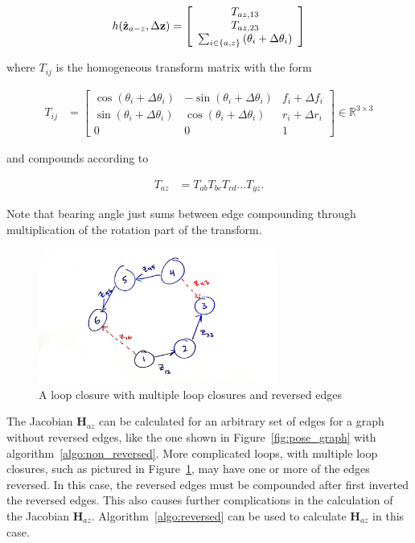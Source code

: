 \begin{align*}
	h(\hat{\mathbf{z}}_{a-z},\Delta\mathbf{z}) =  \left[\begin{array}{c}
	T_{az,13} \\ T_{az,23} \\ \sum_{i \in \{a,z\}} \left( \theta_i + \Delta\theta_i \right)
	\end{array}\right]
\end{align*}

where $T_{ij}$ is the  homogeneous transform matrix with the form

\begin{align*}
  T_{ij} &= \left[\begin{array}{ccc}
  \cos(\theta_i + \Delta\theta_i) & -\sin(\theta_i + \Delta\theta_i) & f_i + \Delta f_i \\
  \sin(\theta_i + \Delta\theta_i) &  \cos(\theta_i + \Delta\theta_i) & r_i + \Delta r_i \\ 0 & 0 & 1
\end{array}\right] \in \mathbb{R}^{3 \times 3}
\end{align*}

and compounds according to

\begin{align*}
  T_{az} &= T_{ab} T_{bc} T_{cd} ... T_{yz}.
\end{align*}

Note that bearing angle just sums between edge compounding through multiplication of the rotation part of the transform.

\begin{figure}
  \includegraphics[width=0.7\textwidth]{figures/multiple_lc.jpg}
  \caption{A loop closure with multiple loop closures and reversed edges}
  \label{fig:reversed_pose_graph}
\end{figure}

The Jacobian $\mathbf{H}_{az}$ can be calculated for an arbitrary set of edges for a graph without reversed edges, like the one shown in Figure~\ref{fig:pose_graph} with algorithm~\ref{algo:non_reversed}.  More complicated loops, with multiple loop closures, such as pictured in Figure~\ref{fig:reversed_pose_graph}, may have one or more of the edges reversed.  In this case, the reversed edges must be compounded after first inverted the reversed edges.  This also causes further complications in the calculation of the Jacobian $\mathbf{H}_{az}$.  Algorithm~\ref{algo:reversed} can be used to calculate $\mathbf{H}_{az}$ in this case.

